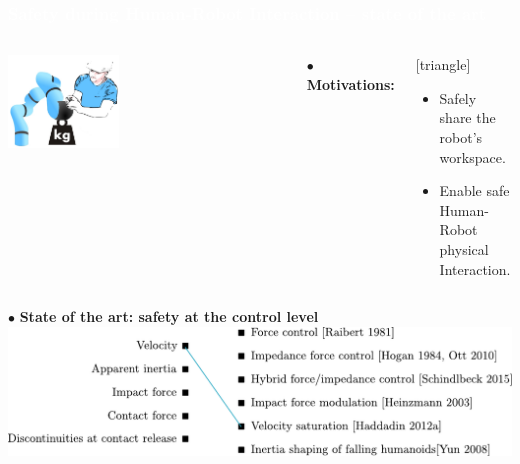 \begin{frame}[noframenumbering]
  \frametitle{{\textcolor{white}{\hspace{0.3cm}Safety during Human-Robot Interaction -- state of the art}}}
  
 \vspace{-3mm} 
\begin{columns}
\column{.47\paperwidth}
\vspace{-5mm}
\begin{center}
\vspace{2mm}
\includegraphics[width=0.4\textwidth ]{figures/Human_robot_int.png}
\end{center}
 \vspace{-3mm} 
\column{.47\paperwidth}
$\bullet$ \textbf{Motivations:}                     
\begin{center}
[triangle]                        
\begin{itemize}
\item Safely share the robot's workspace.
\item Enable safe Human-Robot physical Interaction.
\end{itemize}                                            
\end{center}
\end{columns}

\vspace{7mm}
\hspace{-4mm}
$\bullet$ \textbf{State of the art: safety at the control level}
\vspace{6mm}
\includegraphics[width=1.0\textwidth]{figures/sttt1.pdf}
\vspace{-1mm}






\end{frame}



